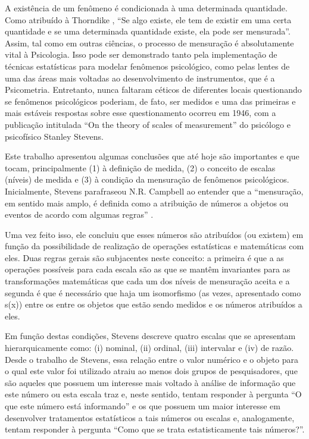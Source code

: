 \documentclass[
]{book}
\begin{document}
A existência de um fenômeno é condicionada à uma determinada quantidade. Como atribuído à Thorndike \citeyearpar{Thorndike1914}, ``Se algo existe, ele tem de existir em uma certa quantidade e se uma determinada quantidade existe, ela pode ser mensurada''. Assim, tal como em outras ciências, o processo de mensuração é absolutamente vital à Psicologia. Isso pode ser demonstrado tanto pela implementação de técnicas estatísticas para modelar fenômenos psicológico, como pelas lentes de uma das áreas mais voltadas ao desenvolvimento de instrumentos, que é a Psicometria. Entretanto, nunca faltaram céticos de diferentes locais questionando se fenômenos psicológicos poderiam, de fato, ser medidos e uma das primeiras e mais estáveis respostas sobre esse questionamento ocorreu em 1946, com a publicação intitulada ``On the theory of scales of measurement'' do psicólogo e psicofísico Stanley Stevens.

Este trabalho apresentou algumas conclusões que até hoje são importantes e que tocam, principalmente (1) à definição de medida, (2) o conceito de escalas (níveis) de medida e (3) à condição da mensuração de fenômenos psicológicos. Inicialmente, Stevens parafraseou N.R. Campbell ao entender que a ``mensuração, em sentido mais amplo, é definida como a atribuição de números a objetos ou eventos de acordo com algumas regras'' \citep[p.677]{Stevens1946}.

Uma vez feito isso, ele concluiu que esses números são atribuídos (ou existem) em função da possibilidade de realização de operações estatísticas e matemáticas com eles. Duas regras gerais são subjacentes neste conceito: a primeira é que a as operações possíveis para cada escala são as que se mantêm invariantes para as transformações matemáticas que cada um dos níveis de mensuração aceita e a segunda é que é necessário que haja um isomorfismo (as vezes, apresentado como s(x)) entre os entre os objetos que estão sendo medidos e os números atribuídos a eles.

Em função destas condições, Stevens descreve quatro escalas que se apresentam hierarquicamente como: (i) nominal, (ii) ordinal, (iii) intervalar e (iv) de razão. Desde o trabalho de Stevens, essa relação entre o valor numérico e o objeto para o qual este valor foi utilizado atraiu ao menos dois grupos de pesquisadores, que são aqueles que possuem um interesse mais voltado à análise de informação que este número ou esta escala traz e, neste sentido, tentam responder à pergunta ``O que este número está informando'' e os que possuem um maior interesse em desenvolver tratamentos estatísticos a tais números ou escalas e, analogamente, tentam responder à pergunta ``Como que se trata estatisticamente tais números?''.
\end{document}
